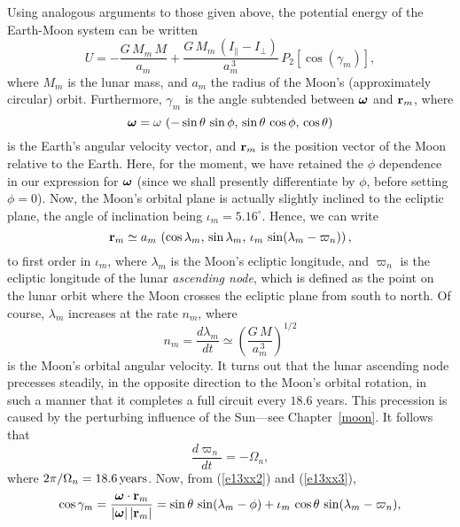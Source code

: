 Using analogous arguments to those given above, the potential energy of the Earth-Moon system can be
written
\begin{equation}\label{e13xx1}
U = - \frac{G\,M_m\,M}{a_m} + \frac{G\,M_m\,(I_\parallel-I_\perp)}{a_m^{\,3}}\,P_2[\cos(\gamma_m)],
\end{equation}
where $M_m$ is the lunar mass, and $a_m$ the radius of the Moon's (approximately circular) orbit. Furthermore, $\gamma_m$ 
 is the angle subtended
between $\mbox{\boldmath$\omega$}$ and ${\bf r}_m$, where 
 \begin{equation}\label{e13xx2}
\mbox{\boldmath$\omega$} = \omega\,\left(-\sin\theta\,\sin\phi,\,\sin\theta\,\cos\phi,\,\cos\theta\right)
\end{equation}
is the Earth's angular velocity vector, and
 ${\bf r}_m$ is the 
position vector of the Moon relative to the Earth. Here, for the moment, we have retained the $\phi$
dependence in our expression for $\mbox{\boldmath$\omega$}$ (since we shall presently differentiate by $\phi$, before setting $\phi=0$). Now, the Moon's orbital plane
is actually slightly inclined to the ecliptic plane,  the angle of inclination being $\iota_m=5.16^\circ$. Hence, we can write
\begin{equation}\label{e13xx3}
{\bf r}_m \simeq a_m\,\left(\cos\lambda_m,\,\sin\lambda_m,\,\iota_m\,\sin(\lambda_m-\varpi_n)\right),
\end{equation}
to first order in $\iota_m$, where $\lambda_m$ is the Moon's ecliptic longitude, and $\varpi_n$ is the ecliptic longitude of the
lunar {\em ascending node}, which is defined as the point on the lunar orbit where  the
Moon crosses the ecliptic plane from south to north. Of course, $\lambda_m$ increases at the rate $n_m$,
where
\begin{equation}
n_m = \frac{d\lambda_m}{dt}\simeq \left(\frac{G\,M}{a_m^{\,3}}\right)^{1/2}
\end{equation}
is the Moon's orbital angular velocity. It turns out that the lunar ascending node precesses steadily,
in the opposite direction to the Moon's orbital rotation, in such a manner that it completes a
full circuit every $18.6$ years. This precession is caused by the perturbing influence of the
Sun---see Chapter~\ref{moon}. It follows that 
\begin{equation}\label{e13xx8}
\frac{d\varpi_n}{dt}= -\Omega_n, 
\end{equation}
where $2\pi/\Omega_n=18.6\,{\rm years}$. 
Now, from (\ref{e13xx2}) and (\ref{e13xx3}), 
\begin{equation}
\cos\gamma_m = \frac{\mbox{\boldmath$\omega$}\cdot{\bf r}_m}{|\mbox{\boldmath$\omega$}|\,|{\bf r}_m|}= \sin\theta\,\sin(\lambda_m-\phi)+\iota_m\,\cos\theta\,\sin(\lambda_m-\varpi_n),
\end{equation}
